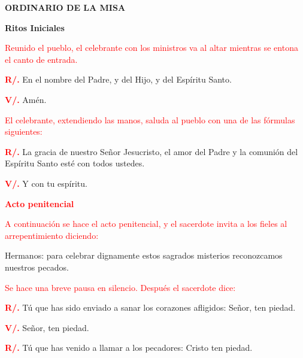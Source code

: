\documentclass[12pt, letterpaper]{report}
\begin{document}
\begin{center}
\Huge {\bfseries ORDINARIO DE LA MISA}
\end{center}

\begin{center}
\Huge {\bfseries Ritos Iniciales}
\end{center}

\large {\textcolor{red}{Reunido el pueblo, el celebrante con los ministros va al altar mientras se entona el canto de entrada.}}

\noindent
\Large {\bfseries \textcolor{red}{R/.}} \hspace{1cm} {En el nombre del Padre, y del Hijo, y del Esp\'iritu Santo.}

\noindent
\Large{{\bfseries \textcolor{red}{V/.}} \hspace{1cm} Am\'en.}

\large {\textcolor{red}{El celebrante, extendiendo las manos, saluda al pueblo con una de las f\'ormulas siguientes:}}

\noindent
\Large {\bfseries \textcolor{red}{R/.}} \hspace{1cm} La gracia de nuestro Se\~nor Jesucristo, el amor del Padre y la comuni\'on del Esp\'iritu Santo est\'e con todos ustedes.

\noindent
{\bfseries \textcolor{red}{V/.}} \hspace{1cm} \Large Y con tu esp\'iritu.

\large {\bfseries \textcolor{red}{Acto penitencial}}

\large {\textcolor{red}{A continuaci\'on se hace el acto penitencial, y el sacerdote invita a los fieles al arrepentimiento
diciendo:}}

\Large {Hermanos: para celebrar dignamente estos sagrados misterios reconozcamos nuestros pecados.}

\large {\textcolor{red}{Se hace una breve pausa en silencio. Despu\'es el sacerdote dice:}}

\noindent
\Large {\bfseries \textcolor{red}{R/.}} \hspace{1cm} T\'u que has sido enviado a sanar los corazones afligidos: Se\~nor, ten piedad.

\noindent
\Large {\bfseries \textcolor{red}{V/.}} \hspace{1cm} Se\~nor, ten piedad. 

\newpage

\noindent
\Large {\bfseries \textcolor{red}{R/.}} \hspace{1cm} T\'u que has venido a llamar a los pecadores: Cristo ten piedad.
\end{document}

